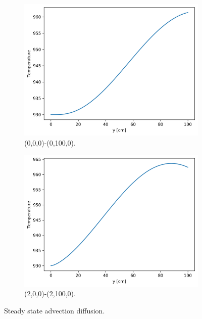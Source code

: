 \documentclass[11pt,letterpaper]{article}
\begin{document}
	\begin{figure}[htbp!]
		\centering
		\begin{subfigure}[t]{0.4\textwidth}
			\centering
			\includegraphics[width=\linewidth]{cg-advec1-ssA}
			\caption{(0,0,0)-(0,100,0).}
		\end{subfigure}
		\begin{subfigure}[t]{0.4\textwidth}
			\centering
	        \includegraphics[width=\linewidth]{cg-advec1-ssB}
			\caption{(2,0,0)-(2,100,0).}
		\end{subfigure}
		\hfill
		\caption{Steady state advection diffusion.}
		\label{fig:cg-advec1-ssA}
	\end{figure}
\end{document}
